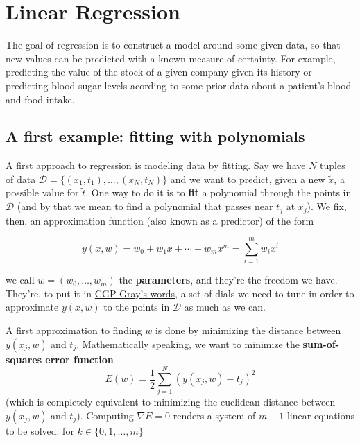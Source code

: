 \chapter{Linear Regression}


The goal of regression is to construct a model around some given data, so that new values can be predicted with a known measure of certainty. For example, predicting the value of the stock of a given company given its history or predicting blood sugar levels acording to some prior data about a patient's blood and food intake.

\section{A first example: fitting with polynomials}

A first approach to regression is modeling data by fitting. Say we have $N$ tuples of data $\mathcal{D} = \{(x_1, t_1), \dots, (x_N, t_N)\}$ and we want to predict, given a new $\widetilde{x}$, a possible value for $\widetilde{t}$. One way to do it is to \textbf{fit} a polynomial through the points in $\mathcal{D}$ (and by that we mean to find a polynomial that passes near $t_j$ at $x_j$). We fix, then, an approximation function (also known as a predictor) of the form

\[y(x,w) = w_0 + w_1x + \cdots + w_mx^m = \sum_{i=1}^m w_ix^i\]

we call $w = (w_0, \dots, w_m)$ the \textbf{parameters}, and they're the freedom we have. They're, to put it in \href{https://youtu.be/wvWpdrfoEv0}{CGP Gray's words}, a set of dials we need to tune in order to approximate $y(x,w)$ to the points in $\mathcal{D}$ as much as we can.

A first approximation to finding $w$ is done by minimizing the distance between $y(x_j, w)$ and $t_j$. Mathematically speaking, we want to minimize the \textbf{sum-of-squares error function}
\[E(w) = \frac{1}{2}\sum_{j=1}^N(y(x_j,w) - t_j)^2\]
(which is completely equivalent to minimizing the euclidean distance between $y(x_j, w)$ and $t_j$). Computing $\nabla E = 0$ renders a system of $m+1$ linear equations to be solved: for $k\in\{0,1,\dots,m\}$

